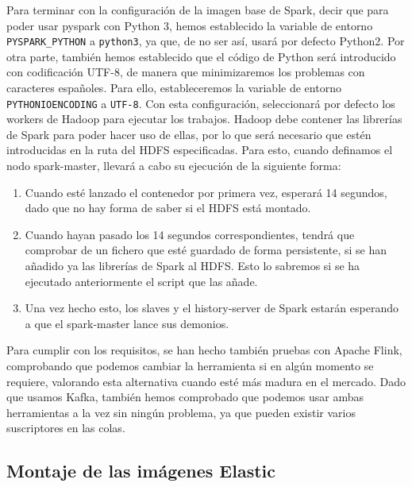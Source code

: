 Para terminar con la configuración de la imagen base de Spark, decir que
para poder usar pyspark con Python 3, hemos establecido la variable de
entorno {\tt PYSPARK\_PYTHON} a {\tt python3}, ya que, de no ser así, usará
por defecto Python2. Por otra parte, también hemos establecido que el
código de Python será introducido con codificación UTF-8, de manera que
minimizaremos los problemas con caracteres españoles. Para ello,
estableceremos la variable de entorno {\tt PYTHONIOENCODING} a {\tt UTF-8}.
Con esta configuración, seleccionará por defecto los workers de Hadoop para
ejecutar los trabajos. Hadoop debe contener las librerías de Spark para
poder hacer uso de ellas, por lo que será necesario que estén introducidas
en la ruta del HDFS especificadas. Para esto, cuando definamos el nodo
spark-master, llevará a cabo su ejecución de la siguiente forma:

\begin{enumerate}
\item Cuando esté lanzado el contenedor por primera vez, esperará 14
  segundos, dado que no hay forma de saber si el HDFS está montado.
\item Cuando hayan pasado los 14 segundos correspondientes, tendrá que
  comprobar de un fichero que esté guardado de forma persistente, si se han
  añadido ya las librerías de Spark al HDFS. Esto lo sabremos si se ha
  ejecutado anteriormente el script que las añade.
\item Una vez hecho esto, los slaves y el history-server de Spark estarán
  esperando a que el spark-master lance sus demonios.
\end{enumerate}

Para cumplir con los requisitos, se han hecho también pruebas con Apache
Flink, comprobando que podemos cambiar la herramienta si en algún momento
se requiere, valorando esta alternativa cuando esté más madura en el
mercado. Dado que usamos Kafka, también hemos comprobado que podemos usar
ambas herramientas a la vez sin ningún problema, ya que pueden existir
varios suscriptores en las colas.


\subsection{Montaje de las imágenes Elastic\label{montElastic}}

